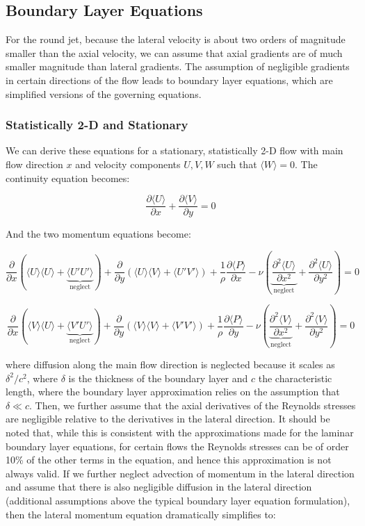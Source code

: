 \documentclass[10pt]{article}
\newcommand{\beq}{\begin{equation}}
\newcommand{\eeq}{\end{equation}}
\newcommand{\la}{\langle}
\newcommand{\ra}{\rangle}
\begin{document}
\begin{flushleft}
\subsection{Boundary Layer Equations}
For the round jet, because the lateral velocity is about two orders of magnitude smaller than the axial velocity, we can assume that axial gradients are of much smaller magnitude than lateral gradients. The assumption of negligible gradients in certain directions of the flow leads to boundary layer equations, which are simplified versions of the governing equations. 


\subsubsection{Statistically 2-D and Stationary}
We can derive these equations for a stationary, statistically 2-D flow with main flow direction \(x\) and velocity components \(U, V, W\) such that \(\la W\ra=0\). The continuity equation becomes:

\beq
\frac{\partial\la U\ra}{\partial x}+\frac{\partial\la V\ra}{\partial y}=0
\eeq

And the two momentum equations become:

\beq
\frac{\partial}{\partial x}\left(\la U\ra\la U\ra+\underbrace{\la U'U'\ra}_{\textrm{neglect}}\right)+\frac{\partial}{\partial y}\left(\la U\ra\la V\ra+\la U'V'\ra\right)+\frac{1}{\rho}\frac{\partial \la P\ra}{\partial x}-\nu\left(\underbrace{\frac{\partial^2 \la U\ra}{\partial x^2}}_{\textrm{neglect}}+\frac{\partial^2 \la U\ra}{\partial y^2}\right)=0
\eeq

\beq
\frac{\partial}{\partial x}\left(\la V\ra\la U\ra+\underbrace{\la V'U'\ra}_{\textrm{neglect}}\right)+\frac{\partial}{\partial y}\left(\la V\ra\la V\ra+\la V'V'\ra\right)+\frac{1}{\rho}\frac{\partial \la P\ra}{\partial y}-\nu\left(\underbrace{\frac{\partial^2 \la V\ra}{\partial x^2}}_{\textrm{neglect}}+\frac{\partial^2 \la V\ra}{\partial y^2}\right)=0
\eeq

where diffusion along the main flow direction is neglected because it scales as \(\delta^2/c^2\), where \(\delta\) is the thickness of the boundary layer and \(c\) the characteristic length, where the boundary layer approximation relies on the assumption that \(\delta\ll c\). Then, we further assume that the axial derivatives of the Reynolds stresses are negligible relative to the derivatives in the lateral direction. It should be noted that, while this is consistent with the approximations made for the laminar boundary layer equations, for certain flows the Reynolds stresses can be of order 10\% of the other terms in the equation, and hence this approximation is not always valid. If we further neglect advection of momentum in the lateral direction and assume that there is also negligible diffusion in the lateral direction (additional assumptions above the typical boundary layer equation formulation), then the lateral momentum equation dramatically simplifies to:


\end{flushleft}
\end{document}
